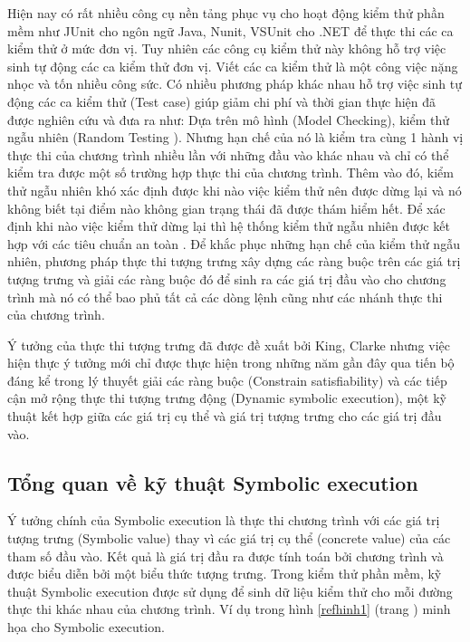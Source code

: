 \documentclass[12pt,a4paper]{report}
\begin{document}
\indent Hiện nay có rất nhiều công cụ nền tảng phục vụ cho hoạt động kiểm thử phần mềm như JUnit cho ngôn ngữ Java, Nunit, VSUnit cho .NET để thực thi các ca kiểm thử ở mức đơn vị. Tuy nhiên các công cụ kiểm thử này không hỗ trợ việc sinh tự động các ca kiểm thử đơn vị. Viết các ca kiểm thử là một công việc nặng nhọc và tốn nhiều công sức. Có nhiều phương pháp khác nhau hỗ trợ việc sinh tự động các ca kiểm thử (Test case) giúp giảm chi phí và thời gian thực hiện đã được nghiên cứu và đưa ra như: Dựa trên mô hình (Model Checking), kiểm thử ngẫu nhiên (Random Testing \cite{boyer1975select}). Nhưng hạn chế của nó là kiểm tra cùng 1 hành vị thực thi của chương trình nhiều lần với những đầu vào khác nhau và chỉ có thể kiểm tra được một số trường hợp thực thi của chương trình. Thêm vào đó, kiểm thử ngẫu nhiên khó xác định được khi nào việc kiểm thử nên được dừng lại và nó không biết tại điểm nào không gian trạng thái đã được thám hiểm hết. Để xác định khi nào việc kiểm thử dừng lại thì hệ thống kiểm thử ngẫu nhiên được kết hợp với các tiêu chuẩn an toàn \cite{zhu1997software}. Để khắc phục những hạn chế của kiểm thử ngẫu nhiên, phương pháp thực thi tượng trưng xây dựng các ràng buộc trên các giá trị tượng trưng và giải các ràng buộc đó để sinh ra các giá trị đầu vào cho chương trình mà nó có thể bao phủ tất cả các dòng lệnh cũng như các nhánh thực thi của chương trình.

\indent Ý tưởng của thực thi tượng trưng đã được đề xuất bởi King, Clarke nhưng việc hiện thực ý tưởng mới chỉ được thực hiện trong những năm gần đây qua tiến bộ đáng kể trong lý thuyết giải các ràng buộc (Constrain satisfiability) \cite{de2011satisfiability} và các tiếp cận mở rộng thực thi tượng trưng động (Dynamic symbolic execution), một kỹ thuật kết hợp giữa các giá trị cụ thể và giá trị 
tượng trưng cho các giá trị đầu vào.

\subsection{Tổng quan về kỹ thuật Symbolic execution}
Ý tưởng chính của Symbolic execution là thực thi chương trình với các giá trị tượng trưng (Symbolic value) thay vì các giá trị cụ thể (concrete value) của các tham số đầu vào. Kết quả là giá trị đầu ra được tính toán bởi chương trình và được biểu diễn bởi một biểu thức tượng trưng. Trong kiểm thử phần mềm, kỹ thuật Symbolic execution được sử dụng để sinh dữ liệu kiểm thử cho mỗi đường thực thi khác nhau của chương trình. Ví dụ trong hình \ref{refhinh1} (trang \pageref{refhinh1}) minh họa cho Symbolic execution.
\end{document}
